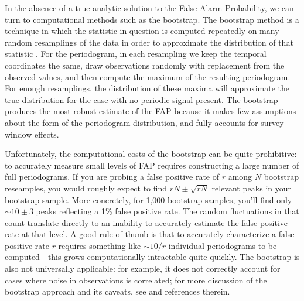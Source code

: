 \documentclass[preprint]{aastex}
\begin{document}
In the absence of a true analytic solution to the False Alarm Probability, we
can turn to computational methods such as the bootstrap.
The bootstrap method is a technique in which the statistic in question is
computed repeatedly on many random resamplings of the data in order to
approximate the distribution of that statistic
\citep[see][for a useful general discussion of this technique]{ICVG2014}.
For the periodogram, in each resampling we keep the temporal coordinates
the same, draw observations randomly with replacement from the observed
values, and then compute the maximum of the resulting periodogram.
For enough resamplings, the distribution of these maxima will approximate
the true distribution for the case with no periodic signal present.
The bootstrap produces the most robust estimate of the FAP because it makes
few assumptions about the form of the periodogram distribution,
and fully accounts for survey window effects.

Unfortunately, the computational costs of the bootstrap can be quite
prohibitive: to accurately measure small levels of FAP requires constructing
a large number of full periodograms.
If you are probing a false positive rate of $r$ among $N$ bootstrap reseamples,
you would roughly expect to find $rN \pm \sqrt{rN}$ relevant peaks in your
bootstrap sample.
More concretely, for 1,000 bootstrap samples, you'll find only $\sim 10\pm 3$
peaks reflecting a 1\% false positive rate.
The random fluctuations in that count translate directly to an inability to
accurately estimate the false positive rate at that level.
A good rule-of-thumb is that to accurately characterize a false positive rate
$r$ requires
something like $\sim 10 / r$ individual periodograms to be computed---this grows
computationally intractable quite quickly.
The bootstrap is also not universally applicable: for example, it does not
correctly account for cases where noise in observations is correlated;
for more discussion of the bootstrap approach and its caveats, see
\citet{ICVG2014} and references therein.
\end{document}
